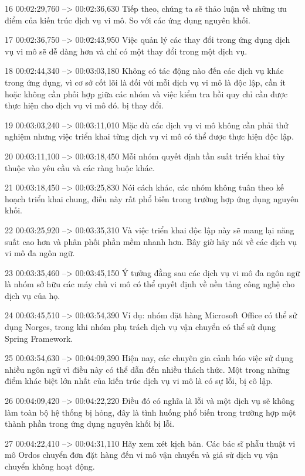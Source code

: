 16
00:02:29,760 --> 00:02:36,630
Tiếp theo, chúng ta sẽ thảo luận về những ưu điểm của kiến ​​trúc dịch vụ vi mô.  So với các ứng dụng nguyên khối.

17
00:02:36,750 --> 00:02:43,950
Việc quản lý các thay đổi trong ứng dụng dịch vụ vi mô sẽ dễ dàng hơn và chỉ có một thay đổi trong một dịch vụ.

18
00:02:44,340 --> 00:03:03,180
Không có tác động nào đến các dịch vụ khác trong ứng dụng, vì cơ sở cốt lõi là đối với mỗi dịch vụ vi mô là độc lập, cần ít hoặc không cần phối hợp giữa các nhóm và việc kiểm tra hồi quy chỉ cần được thực hiện cho dịch vụ vi mô đó.  bị thay đổi.

19
00:03:03,240 --> 00:03:11,010
Mặc dù các dịch vụ vi mô không cần phải thử nghiệm nhưng việc triển khai từng dịch vụ vi mô có thể được thực hiện độc lập.

20
00:03:11,100 --> 00:03:18,450
Mỗi nhóm quyết định tần suất triển khai tùy thuộc vào yêu cầu và các ràng buộc khác.

21
00:03:18,450 --> 00:03:25,830
Nói cách khác, các nhóm không tuân theo kế hoạch triển khai chung, điều này rất phổ biến trong trường hợp ứng dụng nguyên khối.

22
00:03:25,920 --> 00:03:35,310
Và việc triển khai độc lập này sẽ mang lại năng suất cao hơn và phân phối phần mềm nhanh hơn.  Bây giờ hãy nói về các dịch vụ vi mô đa ngôn ngữ.

23
00:03:35,460 --> 00:03:45,150
Ý tưởng đằng sau các dịch vụ vi mô đa ngôn ngữ là nhóm sở hữu các máy chủ vi mô có thể quyết định về nền tảng công nghệ cho dịch vụ của họ.

24
00:03:45,510 --> 00:03:54,390
Ví dụ: nhóm đặt hàng Microsoft Office có thể sử dụng Norges, trong khi nhóm phụ trách dịch vụ vận chuyển có thể sử dụng Spring Framework.

25
00:03:54,630 --> 00:04:09,390
Hiện nay, các chuyên gia cảnh báo việc sử dụng nhiều ngôn ngữ vì điều này có thể dẫn đến nhiều thách thức.  Một trong những điểm khác biệt lớn nhất của kiến ​​trúc dịch vụ vi mô là có sự lỗi, bị cô lập.

26
00:04:09,420 --> 00:04:22,220
Điều đó có nghĩa là lỗi và một dịch vụ sẽ không làm toàn bộ hệ thống bị hỏng, đây là tình huống phổ biến trong trường hợp một thành phần trong ứng dụng nguyên khối bị lỗi.

27
00:04:22,410 --> 00:04:31,110
Hãy xem xét kịch bản.  Các bác sĩ phẫu thuật vi mô Ordos chuyển đơn đặt hàng đến vi mô vận chuyển và giả sử dịch vụ vận chuyển không hoạt động.

